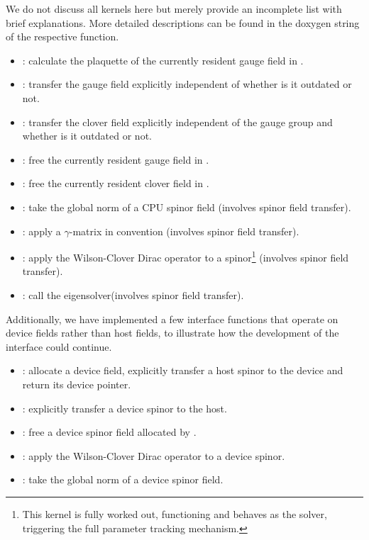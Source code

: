 We do not discuss all kernels here but merely provide an incomplete list with brief explanations. More detailed descriptions can be found in the doxygen string of the respective function.
\begin{itemize}
  \item {}: calculate the plaquette of the currently resident gauge field in \quda.
  \item {}: transfer the gauge field explicitly independent of whether is it outdated or not.
  \item {}: transfer the clover field explicitly independent of the gauge group and whether is it outdated or not.
  \item {}: free the currently resident gauge field in \quda.
  \item {}: free the currently resident clover field in \quda.
  \item {}: take the global norm of a CPU spinor field (involves spinor field transfer).
  \item {}: apply a $\gamma$-matrix in \openqxd convention (involves spinor field transfer).
  \item {}: apply the Wilson-Clover Dirac operator to a spinor\footnote{This kernel is fully worked out, functioning and behaves as the solver, triggering the full parameter tracking mechanism.} (involves spinor field transfer).
  \item {}: call the eigensolver\footnotemark[\value{footnote}] (involves spinor field transfer).
\end{itemize}

Additionally, we have implemented a few interface functions that operate on device fields rather than host fields, to illustrate how the development of the interface could continue.
\begin{itemize}
  \item {}: allocate a device field, explicitly transfer a host spinor to the device and return its device pointer.
  \item {}: explicitly transfer a device spinor to the host.
  \item {}: free a device spinor field allocated by .
  \item {}: apply the Wilson-Clover Dirac operator to a device spinor\footnotemark[\value{footnote}].
  \item {}: take the global norm of a device spinor field.
\end{itemize}

